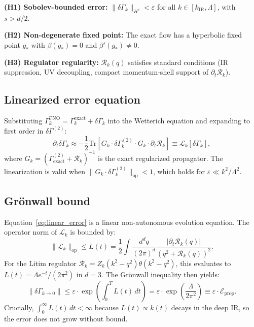 \textbf{(H1) Sobolev-bounded error:} $\|\delta\Gamma_k\|_{H^s} < \varepsilon$ for all $k\in[k_{\mathrm{IR}},\Lambda]$, with $s > d/2$.

\textbf{(H2) Non-degenerate fixed point:} The exact flow has a hyperbolic fixed point $g_*$ with $\beta(g_*)=0$ and $\beta'(g_*)\neq 0$.

\textbf{(H3) Regulator regularity:} $\mathcal{R}_k(q)$ satisfies standard conditions (IR suppression, UV decoupling, compact momentum-shell support of $\partial_t\mathcal{R}_k$).

\subsection{Linearized error equation}

Substituting $\Gamma_k^{\mathrm{FNO}} = \Gamma_k^{\mathrm{exact}} + \delta\Gamma_k$ into the Wetterich equation and expanding to first order in $\delta\Gamma^{(2)}$:
\begin{equation}\label{eq:linear_error}
\partial_t\delta\Gamma_k \approx -\frac{1}{2}\mathrm{Tr}\left[G_k\cdot\delta\Gamma_k^{(2)}\cdot G_k\cdot\partial_t\mathcal{R}_k\right] \equiv \mathcal{L}_k[\delta\Gamma_k],
\end{equation}
where $G_k = (\Gamma_{\mathrm{exact}}^{(2)} + \mathcal{R}_k)^{-1}$ is the exact regularized propagator. The linearization is valid when $\|G_k\cdot\delta\Gamma_k^{(2)}\|_{\mathrm{op}} < 1$, which holds for $\varepsilon \ll k^2/\Lambda^2$.

\subsection{Gr\"onwall bound}

Equation~\eqref{eq:linear_error} is a linear non-autonomous evolution equation. The operator norm of $\mathcal{L}_k$ is bounded by:
\begin{equation}
\|\mathcal{L}_k\|_{\mathrm{op}} \leq L(t) = \frac{1}{2}\int\frac{d^dq}{(2\pi)^d}\frac{|\partial_t\mathcal{R}_k(q)|}{(q^2+\mathcal{R}_k(q))^2}.
\end{equation}
For the Litim regulator $\mathcal{R}_k = Z_k(k^2-q^2)\theta(k^2-q^2)$, this evaluates to $L(t) = \Lambda e^{-t}/(2\pi^2)$ in $d=3$. The Gr\"onwall inequality then yields:
\begin{equation}
\|\delta\Gamma_{k\to 0}\| \leq \varepsilon\cdot\exp\!\left(\int_0^T L(t)\,dt\right) = \varepsilon\cdot\exp\!\left(\frac{\Lambda}{2\pi^2}\right) \equiv \varepsilon\cdot\mathcal{E}_{\mathrm{prop}}.
\end{equation}
Crucially, $\int_0^\infty L(t)\,dt < \infty$ because $L(t)\propto k(t)$ decays in the deep IR, so the error does not grow without bound.

